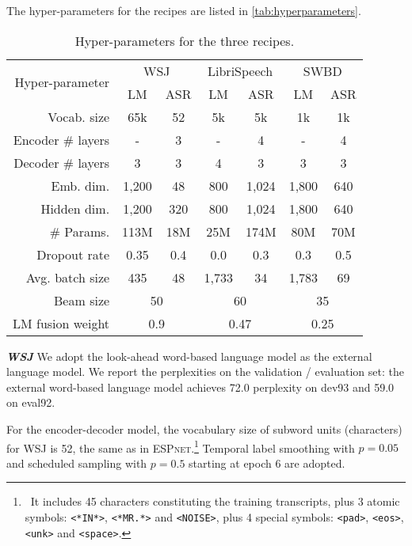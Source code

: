 \documentclass{article}
\def\espnet{\textsc{ESPnet}\xspace}
\begin{document}
The hyper-parameters for the recipes are listed in \autoref{tab:hyperparameters}. 
\begin{table}[tb]
    \centering
    \caption{Hyper-parameters for the three recipes.}
    \begin{adjustbox}{max width=\linewidth}
    \begin{tabular}{rcccccc}
        \toprule
        \multirow{2}{*}{Hyper-parameter} & \multicolumn{2}{c}{WSJ} & \multicolumn{2}{c}{LibriSpeech} & \multicolumn{2}{c}{SWBD} \\
        \cmidrule(lr){2-3} \cmidrule(lr){4-5} \cmidrule(lr){6-7}
        & LM & ASR & LM & ASR & LM & ASR \\
        \midrule
        Vocab. size  & 65k & 52 & 5k & 5k & 1k & 1k \\
        Encoder \# layers & - & 3 & - & 4 & - & 4 \\
        Decoder \# layers & 3 & 3 & 4 & 3 & 3 & 3 \\
        Emb. dim.  & 1,200  & 48 & 800 & 1,024 & 1,800 & 640\\
        Hidden dim. & 1,200  & 320 & 800 & 1,024 & 1,800 & 640\\
        \# Params. & 113M & 18M & 25M & 174M & 80M & 70M\\
        Dropout rate     & 0.35   & 0.4 & 0.0 & 0.3 & 0.3 & 0.5\\
        Avg. batch size & 435 & 48 & 1,733 & 34 & 1,783 & 69\\
        \midrule
        Beam size & \multicolumn{2}{c}{50} & \multicolumn{2}{c}{60} & \multicolumn{2}{c}{35} \\
        LM fusion weight & \multicolumn{2}{c}{0.9} & \multicolumn{2}{c}{0.47} & \multicolumn{2}{c}{0.25} \\
        \bottomrule
    \end{tabular}
    \end{adjustbox}
    \label{tab:hyperparameters}
\end{table}



\vspace{0.2cm}
\noindent \textbf{\textit{WSJ}}\quad
We adopt the look-ahead word-based language model \cite{hori2018endtoend} as the external language model. We report the perplexities on the validation / evaluation set: the external word-based language model achieves 72.0 perplexity on dev93 and 59.0 on eval92. 

For the encoder-decoder model, the vocabulary size of subword units (characters) for WSJ is 52, the same as in \espnet.\footnote{~It includes 45 characters constituting the training transcripts, plus 3 atomic symbols: \texttt{<*IN*>}, \texttt{<*MR.*>} and \texttt{<NOISE>}, plus 4 special symbols: \texttt{<pad>}, \texttt{<eos>}, \texttt{<unk>} and \texttt{<space>}.} Temporal label smoothing with $p=0.05$ and scheduled sampling with $p=0.5$ starting at epoch 6 are adopted. 
\end{document}
